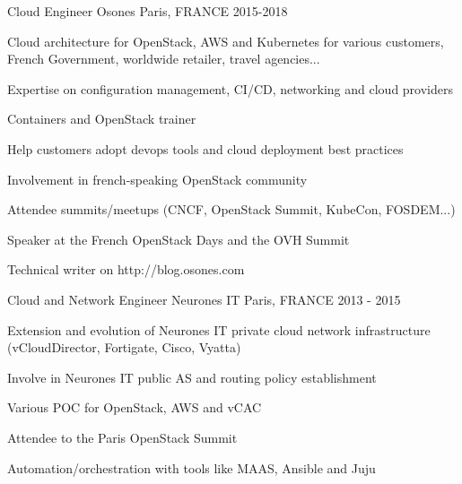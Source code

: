 \begin{cventries}
  \cventry
    {Cloud Engineer} %
    {Osones} %
    {Paris, FRANCE} %
    {2015-2018} %
    {
      \begin{cvitems} %
      \item {Cloud architecture for OpenStack, AWS and Kubernetes for various
       customers, French Government, worldwide retailer, travel agencies...}
      \item {Expertise on configuration management, CI/CD, networking and cloud
       providers}
      \item {Containers and OpenStack trainer}
      \item {Help customers adopt devops tools and cloud deployment best
       practices}
      \item {Involvement in french-speaking OpenStack community}
      \item {Attendee summits/meetups (CNCF, OpenStack Summit, KubeCon, FOSDEM...)}
      \item {Speaker at the French OpenStack Days and the OVH Summit}
      \item {Technical writer on http://blog.osones.com}
      \end{cvitems}
    }
\vspace{0.5cm}


  \cventry
    {Cloud and Network Engineer}
    {Neurones IT} %
    {Paris, FRANCE} %
    {2013 - 2015} %
    {
      \begin{cvitems} %
        \item {Extension and evolution of Neurones IT private cloud
          network infrastructure (vCloudDirector, Fortigate, Cisco, Vyatta)}
        \item {Involve in Neurones IT public AS and routing policy
          establishment}
        \item {Various POC for OpenStack, AWS and vCAC}
        \item {Attendee to the Paris OpenStack Summit}
        \item {Automation/orchestration with tools like MAAS, Ansible and Juju}
      \end{cvitems}
    }

\end{cventries}
